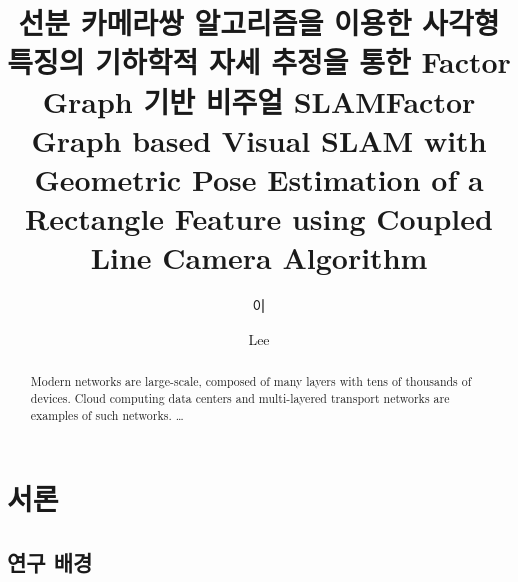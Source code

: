 \documentclass[master,korean,final]{cbnu-ecs}
\title[korean]{선분 카메라쌍 알고리즘을 이용한 사각형 특징의 기하학적 자세 추정을 통한 Factor Graph 기반 비주얼 SLAM}
\title[english]{Factor Graph based Visual SLAM with Geometric Pose Estimation of a Rectangle Feature using Coupled Line Camera Algorithm}
\author[korean] {이}{재 민}
\author[english]{Lee}{Jae-Min}
\begin{document}
\tableofcontents
\listoffigures
\listoftables
\begin{abstract}
Modern networks are large-scale, composed of many layers with tens of thousands of devices. 
Cloud computing data centers and multi-layered transport networks are 
examples of such networks.
\ldots
\end{abstract}







\chapter{서론}
\section{연구 배경}
\end{document}
